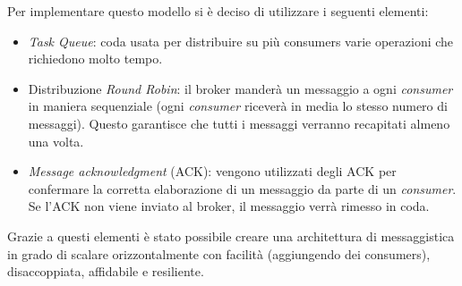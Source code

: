 Per implementare questo modello si è deciso di utilizzare i seguenti elementi:
\begin{itemize}
    \itemsep0em
    \item \textit{Task Queue}: coda usata per distribuire su più consumers varie operazioni che richiedono molto tempo.
    \item Distribuzione \textit{Round Robin}: il broker manderà un messaggio a ogni \textit{consumer} in maniera sequenziale (ogni \textit{consumer} riceverà in media lo stesso numero di messaggi). Questo garantisce che tutti i messaggi verranno recapitati almeno una volta.
    \item \textit{Message acknowledgment} (ACK): vengono utilizzati degli ACK per confermare la corretta elaborazione di un messaggio da parte di un \textit{consumer}. Se l'ACK non viene inviato al broker, il messaggio verrà rimesso in coda.
\end{itemize}
Grazie a questi elementi è stato possibile creare una architettura di messaggistica in grado di scalare orizzontalmente con facilità (aggiungendo dei consumers), disaccoppiata, affidabile e resiliente.



